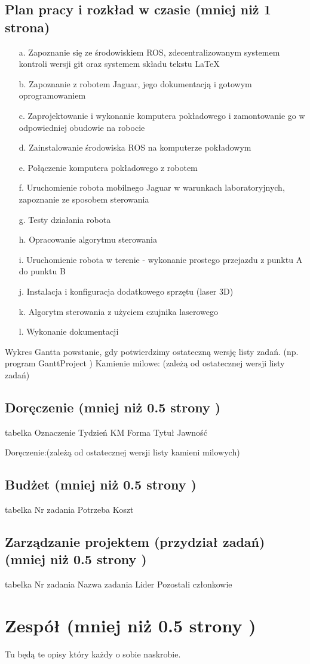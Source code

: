 \subsection{Plan pracy i rozkład w czasie (mniej niż 1 strona)}
\begin{enumerate}
\item[a.] Zapoznanie się ze środowiskiem ROS, zdecentralizowanym systemem kontroli wersji git oraz systemem składu tekstu LaTeX
\item[b.] Zapoznanie z robotem Jaguar, jego dokumentacją i gotowym oprogramowaniem
\item[c.] Zaprojektowanie i wykonanie komputera pokładowego i zamontowanie go w odpowiedniej obudowie na robocie
\item[d.] Zainstalowanie środowiska ROS na komputerze pokładowym
\item[e.] Połączenie komputera pokładowego z robotem
\item[f.] Uruchomienie robota mobilnego Jaguar w warunkach laboratoryjnych, zapoznanie ze sposobem sterowania
\item[g.] Testy działania robota
\item[h.] Opracowanie algorytmu sterowania
\item[i.] Uruchomienie robota w terenie - wykonanie prostego przejazdu z punktu A do punktu B
\item[j.] Instalacja i konfiguracja dodatkowego sprzętu (laser 3D)
\item[k.] Algorytm sterowania z użyciem czujnika laserowego
\item[l.] Wykonanie dokumentacji
\end{enumerate}

Wykres Gantta powstanie, gdy potwierdzimy ostateczną wersję listy zadań. (np. program GanttProject )
Kamienie milowe: (zależą od ostatecznej wersji listy zadań)
		
\subsection{Doręczenie (mniej niż 0.5 strony )}
    tabelka
    Oznaczenie	Tydzień	KM	Forma	Tytuł	Jawność
	
	
Doręczenie:(zależą od ostatecznej wersji listy kamieni milowych)			

\subsection{Budżet (mniej niż 0.5 strony )}
	tabelka
	Nr zadania	Potrzeba	Koszt			
													
			
\subsection{Zarządzanie projektem (przydział zadań) (mniej niż 0.5 strony )}
	
	tabelka
	Nr zadania	Nazwa zadania		Lider	Pozostali członkowie
	
	
\section{Zespół (mniej niż 0.5 strony )}
	Tu będą te opisy który każdy o sobie naskrobie.
	
	
	
	
	
